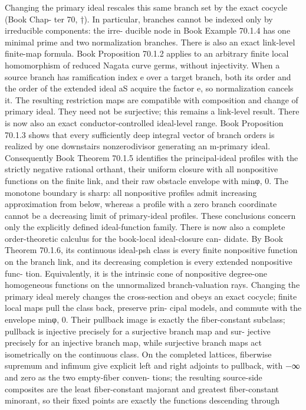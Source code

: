 \documentclass[11pt]{article}
\begin{document}
\begin{OriginalTaskDATA}
Changing the primary ideal rescales this same branch set by the exact cocycle (Book Chap-
ter 70, †). In particular, branches cannot be indexed only by irreducible components: the irre-
ducible node in Book Example 70.1.4 has one minimal prime and two normalization branches.
    There is also an exact link-level ﬁnite-map formula. Book Proposition 70.1.2 applies to
an arbitrary ﬁnite local homomorphism of reduced Nagata curve germs, without injectivity.
When a source branch has ramiﬁcation index e over a target branch, both its order and the
order of the extended ideal aS acquire the factor e, so normalization cancels it. The resulting
restriction maps are compatible with composition and change of primary ideal. They need
not be surjective; this remains a link-level result.
    There is now also an exact conductor-controlled ideal-level range. Book Proposition 70.1.3
shows that every suﬃciently deep integral vector of branch orders is realized by one downstairs
nonzerodivisor generating an m-primary ideal. Consequently Book Theorem 70.1.5 identiﬁes
the principal-ideal proﬁles with the strictly negative rational orthant, their uniform closure
with all nonpositive functions on the ﬁnite link, and their raw obstacle envelope with min{φ, 0}.
The monotone boundary is sharp: all nonpositive proﬁles admit increasing approximation
from below, whereas a proﬁle with a zero branch coordinate cannot be a decreasing limit of
primary-ideal proﬁles. These conclusions concern only the explicitly deﬁned ideal-function
family.
    There is now also a complete order-theoretic calculus for the book-local ideal-closure can-
didate. By Book Theorem 70.1.6, its continuous ideal-psh class is every ﬁnite nonpositive
function on the branch link, and its decreasing completion is every extended nonpositive func-
tion. Equivalently, it is the intrinsic cone of nonpositive degree-one homogeneous functions
on the unnormalized branch-valuation rays. Changing the primary ideal merely changes the
cross-section and obeys an exact cocycle; ﬁnite local maps pull the class back, preserve prin-
cipal models, and commute with the envelope min{φ, 0}. Their pullback image is exactly the
ﬁber-constant subclass; pullback is injective precisely for a surjective branch map and sur-
jective precisely for an injective branch map, while surjective branch maps act isometrically
on the continuous class. On the completed lattices, ﬁberwise supremum and inﬁmum give
explicit left and right adjoints to pullback, with −∞ and zero as the two empty-ﬁber conven-
tions; the resulting source-side composites are the least ﬁber-constant majorant and greatest
ﬁber-constant minorant, so their ﬁxed points are exactly the functions descending through


\end{OriginalTaskDATA}
\end{document}
